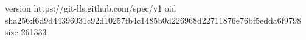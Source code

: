 version https://git-lfs.github.com/spec/v1
oid sha256:f6d9d44396031c92d10257fb4c1485b0d226968d22711876e76bf5edda6f9798
size 261333
